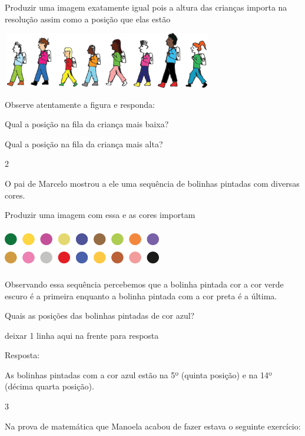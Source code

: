 Produzir uma imagem exatamente igual pois a altura das crianças importa
na resolução assim como a posição que elas estão

\includegraphics[width=3.62531in,height=0.96675in]{media/image27.png}

Observe atentamente a figura e responda:

\begin{escolha}

  \item Qual a posição na fila da criança mais baixa?


  \item Qual a posição na fila da criança mais alta?


\end{escolha}

\num{2}

O pai de Marcelo mostrou a ele uma sequência de bolinhas pintadas com
diversas cores.

Produzir uma imagem com essa e as cores importam

\includegraphics[width=2.72524in,height=0.68339in]{media/image28.png}

Observando essa sequência percebemos que a bolinha pintada cor a cor
verde escuro é a primeira enquanto a bolinha pintada com a cor preta é a
última.

Quais as posições das bolinhas pintadas de cor azul?

deixar 1 linha aqui na frente para resposta

Resposta:

As bolinhas pintadas com a cor azul estão na 5º (quinta posição) e na
14º (décima quarta posição).

\num{3}

Na prova de matemática que Manoela acabou de fazer estava o seguinte
exercício:

